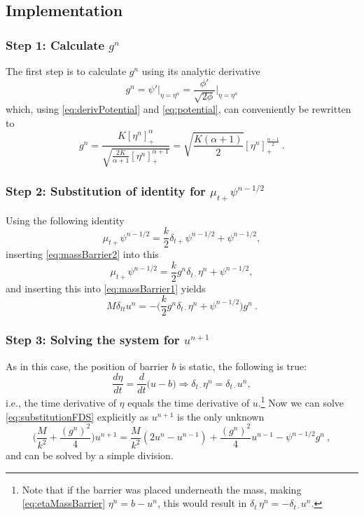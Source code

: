 \documentclass{article}
\begin{document}
\subsection{Implementation}
\subsubsection*{Step 1: Calculate $g^n$}
The first step is to calculate $g^n$ using its analytic derivative
\begin{equation}
    g^n = \psi'\bigg\rvert_{\eta=\eta^n} = \frac{\phi'}{\sqrt{2\phi}}\bigg\rvert_{\eta=\eta^n}
\end{equation}
which, using \eqref{eq:derivPotential} and \eqref{eq:potential}, can conveniently be rewritten to
\begin{equation}\label{eq:gn}
    g^n = \frac{K[\eta^n]_+^\alpha}{\sqrt{\frac{2K}{\alpha+1}[\eta^n]_+^{\alpha+1}}}=\sqrt{\frac{K(\alpha+1)}{2}}[\eta^n]_+^{\frac{\alpha-1}{2}}\ .
\end{equation}
\subsubsection*{Step 2: Substitution of identity for $\mu_{t+}\psi^{n-1/2}$}
Using the following identity
\begin{equation}
    \mu_{t+}\psi^{n-1/2} = \frac{k}{2}\delta_{t+}\psi^{n-1/2} + \psi^{n-1/2},
\end{equation}
inserting \eqref{eq:massBarrier2} into this 
\begin{equation}\nonumber
    \mu_{t+}\psi^{n-1/2} = \frac{k}{2}g^n\delta_{t\cdot}\eta^n + \psi^{n-1/2},
\end{equation}
and inserting this into \eqref{eq:massBarrier1} yields
\begin{equation}\label{eq:substitutionFDS}
    M\delta_{tt}u^n = -\Big(\frac{k}{2}g^n\delta_{t\cdot}\eta^n + \psi^{n-1/2}\Big)g^n\ .
\end{equation}
\subsubsection*{Step 3: Solving the system for $u^{n+1}$}
As in this case, the position of barrier $b$ is static, the following is true:
\begin{equation}\label{eq:derEtaEqDerU}
    \frac{d\eta}{dt} = \frac{d}{dt}\Big(u - b\Big)\Rightarrow \delta_{t\cdot}\eta^n = \delta_{t\cdot}u^n,
\end{equation}
i.e., the time derivative of $\eta$ equals the time derivative of $u$.\footnote{Note that if the barrier was placed underneath the mass, making \eqref{eq:etaMassBarrier} $\eta^n = b-u^n$, this would result in $\delta_{t_\cdot}\eta^n = -\delta_{t\cdot}u^n$.} Now we can solve \eqref{eq:substitutionFDS} explicitly as $u^{n+1}$ is the only unknown
\begin{equation}
    \bigg(\frac{M}{k^2} + \frac{(g^n)^2}{4}\bigg)u^{n+1} = \frac{M}{k^2}(2u^n-u^{n-1})+\frac{(g^n)^2}{4}u^{n-1}-\psi^{n-1/2}g^n\ ,
\end{equation}
and can be solved by a simple division. 
\end{document}
